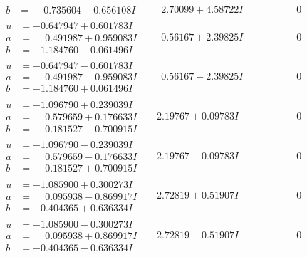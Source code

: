 \documentclass[1p]{elsarticle_modified}
\theoremstyle{definition}
\begin{document}
$$\begin{array}{c|c|c}
\begin{aligned}
b &= \phantom{-}0.735604 - 0.656108 I\end{aligned}
 & \phantom{-}2.70099 + 4.58722 I & \phantom{-0.000000 } 0 \\ \hline\begin{aligned}
u &= -0.647947 + 0.601783 I \\
a &= \phantom{-}0.491987 + 0.959083 I \\
b &= -1.184760 - 0.061496 I\end{aligned}
 & \phantom{-}0.56167 + 2.39825 I & \phantom{-0.000000 } 0 \\ \hline\begin{aligned}
u &= -0.647947 - 0.601783 I \\
a &= \phantom{-}0.491987 - 0.959083 I \\
b &= -1.184760 + 0.061496 I\end{aligned}
 & \phantom{-}0.56167 - 2.39825 I & \phantom{-0.000000 } 0 \\ \hline\begin{aligned}
u &= -1.096790 + 0.239039 I \\
a &= \phantom{-}0.579659 + 0.176633 I \\
b &= \phantom{-}0.181527 - 0.700915 I\end{aligned}
 & -2.19767 + 0.09783 I & \phantom{-0.000000 } 0 \\ \hline\begin{aligned}
u &= -1.096790 - 0.239039 I \\
a &= \phantom{-}0.579659 - 0.176633 I \\
b &= \phantom{-}0.181527 + 0.700915 I\end{aligned}
 & -2.19767 - 0.09783 I & \phantom{-0.000000 } 0 \\ \hline\begin{aligned}
u &= -1.085900 + 0.300273 I \\
a &= \phantom{-}0.095938 - 0.869917 I \\
b &= -0.404365 + 0.636334 I\end{aligned}
 & -2.72819 + 0.51907 I & \phantom{-0.000000 } 0 \\ \hline\begin{aligned}
u &= -1.085900 - 0.300273 I \\
a &= \phantom{-}0.095938 + 0.869917 I \\
b &= -0.404365 - 0.636334 I\end{aligned}
 & -2.72819 - 0.51907 I & \phantom{-0.000000 } 0 \\ \hline\begin{aligned}

\end{aligned}
\end{array}$$
\end{document}
